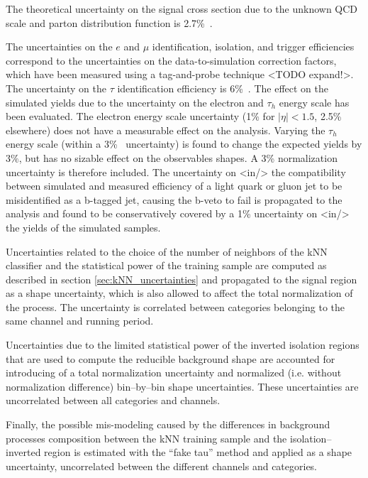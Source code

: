 The theoretical uncertainty on the signal cross section due to the unknown QCD scale and parton distribution function is 2.7\%~\cite{LHCHiggsCrossSectionWorkingGroup:2011ti}.

The uncertainties on the $e$ and $\mu$ identification, isolation, and trigger efficiencies correspond to the uncertainties on the data-to-simulation correction factors, which have been measured using a tag-and-probe technique <TODO expand!>.
The uncertainty on the $\tau$ identification efficiency is 6\%~\cite{CMS-PAS-TAU-11-001}.
The effect on the simulated yields due to the uncertainty on the electron and $\tau_h$ energy scale has been evaluated.
The electron energy scale uncertainty (1\% for $|\eta| < 1.5$, 2.5\% elsewhere) does not have a measurable effect on the analysis.
Varying the $\tau_h$ energy scale (within a 3\%~\cite{H_tautau} uncertainty) is found to change the expected yields by $3\%$, but has no sizable effect on the observables shapes. A 3\% normalization uncertainty is therefore included.
The uncertainty on <in/> the compatibility between simulated and measured efficiency of a light quark or gluon jet to be misidentified as a b-tagged jet, causing the b-veto to 
fail is propagated to the analysis and found to be conservatively covered by a 1\% uncertainty on <in/> the yields of the simulated samples.

Uncertainties related to the choice of the number of neighbors of the kNN classifier and the statistical power of the training sample are computed as described in section \ref{sec:kNN_uncertainties} and propagated to the signal region as a shape uncertainty, which is also allowed to affect the total normalization of the process. The uncertainty is correlated between categories belonging to the same channel and running period.

Uncertainties due to the limited statistical power of the inverted isolation regions that are used to compute the reducible background shape are accounted for introducing of a total normalization uncertainty and normalized (i.e. without normalization difference) bin--by--bin shape uncertainties. These uncertainties are uncorrelated between all categories and channels.

Finally, the possible mis-modeling caused by the differences in background processes composition between the kNN training sample and the isolation--inverted region is estimated with the ``fake tau'' method and applied as a shape uncertainty, uncorrelated between the different channels and categories.

